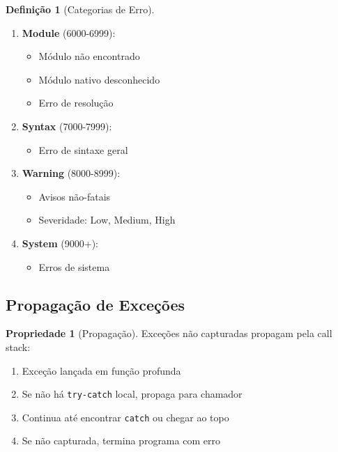 \documentclass[12pt,a4paper]{article}
\theoremstyle{definition}
\newtheorem{definition}{Definição}[section]
\newtheorem{property}{Propriedade}[section]
\begin{document}
\begin{definition}[Categorias de Erro]
\begin{enumerate}
    \item \textbf{Module} (6000-6999):
    \begin{itemize}[noitemsep]
        \item Módulo não encontrado
        \item Módulo nativo desconhecido
        \item Erro de resolução
    \end{itemize}
    
    \item \textbf{Syntax} (7000-7999):
    \begin{itemize}[noitemsep]
        \item Erro de sintaxe geral
    \end{itemize}
    
    \item \textbf{Warning} (8000-8999):
    \begin{itemize}[noitemsep]
        \item Avisos não-fatais
        \item Severidade: Low, Medium, High
    \end{itemize}
    
    \item \textbf{System} (9000+):
    \begin{itemize}[noitemsep]
        \item Erros de sistema
    \end{itemize}
\end{enumerate}
\end{definition}

\subsection{Propagação de Exceções}

\begin{property}[Propagação]
Exceções não capturadas propagam pela call stack:

\begin{enumerate}
    \item Exceção lançada em função profunda
    \item Se não há \texttt{try-catch} local, propaga para chamador
    \item Continua até encontrar \texttt{catch} ou chegar ao topo
    \item Se não capturada, termina programa com erro
\end{enumerate}
\end{property}
\end{document}
